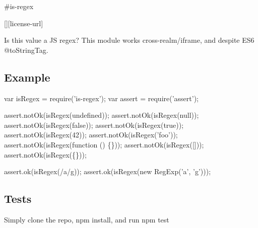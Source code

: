 \#is-\/regex \textsuperscript{\href{https://npmjs.org/package/is-regex}{\tt }}

\href{https://travis-ci.org/ljharb/is-regex}{\tt } \href{https://david-dm.org/ljharb/is-regex}{\tt } \href{https://david-dm.org/ljharb/is-regex#info=devDependencies}{\tt } \mbox{[}\mbox{]}\mbox{[}license-\/url\mbox{]} \href{http://npm-stat.com/charts.html?package=is-regex}{\tt }

\href{https://npmjs.org/package/is-regex}{\tt }

\href{https://ci.testling.com/ljharb/is-regex}{\tt }

Is this value a JS regex? This module works cross-\/realm/iframe, and despite E\+S6 @to\+String\+Tag.

\subsection*{Example}


\begin{DoxyCode}
var isRegex = require('is-regex');
var assert = require('assert');

assert.notOk(isRegex(undefined));
assert.notOk(isRegex(null));
assert.notOk(isRegex(false));
assert.notOk(isRegex(true));
assert.notOk(isRegex(42));
assert.notOk(isRegex('foo'));
assert.notOk(isRegex(function () \{\}));
assert.notOk(isRegex([]));
assert.notOk(isRegex(\{\}));

assert.ok(isRegex(/a/g));
assert.ok(isRegex(new RegExp('a', 'g')));
\end{DoxyCode}


\subsection*{Tests}

Simply clone the repo, {\ttfamily npm install}, and run {\ttfamily npm test} 